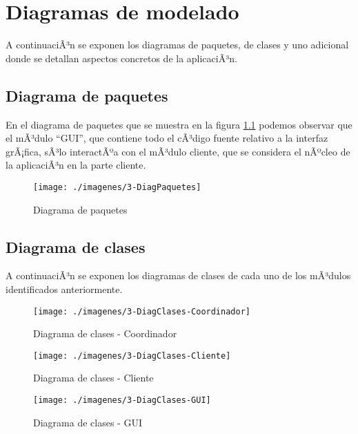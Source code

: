 \chapter{Diagramas de modelado}
A continuaciÃ³n se exponen los diagramas de paquetes, de clases y uno adicional donde se detallan aspectos concretos de la aplicaciÃ³n.\\

   \section{Diagrama de paquetes}
   En el diagrama de paquetes que se muestra en la figura \ref{diagramaPaquetes} podemos observar que el mÃ³dulo ``GUI'', que contiene todo el
   cÃ³digo fuente relativo a la interfaz grÃ¡fica, sÃ³lo interactÃºa con el mÃ³dulo cliente, que se considera el nÃºcleo de la aplicaciÃ³n en la parte
   cliente.\\

  \begin{figure} [H] \begin{center}
    \texttt{[image: ./imagenes/3-DiagPaquetes]}
    \caption{Diagrama de paquetes} \label{diagramaPaquetes}
  \end{center} \end{figure}


   \section{Diagrama de clases}
   A continuaciÃ³n se exponen los diagramas de clases de cada uno de los mÃ³dulos identificados anteriormente.\\
  \begin{figure} [H] \begin{center}
    \texttt{[image: ./imagenes/3-DiagClases-Coordinador]}
    \caption{Diagrama de clases - Coordinador} \label{DCcoord}
  \end{center} \end{figure}

  \begin{figure} [H] \begin{center}
    \texttt{[image: ./imagenes/3-DiagClases-Cliente]}
    \caption{Diagrama de clases - Cliente} \label{DCclient}
  \end{center} \end{figure}

  \begin{figure} [H] \begin{center}
    \texttt{[image: ./imagenes/3-DiagClases-GUI]}
    \caption{Diagrama de clases - GUI} \label{DCGUI}
  \end{center} \end{figure}

